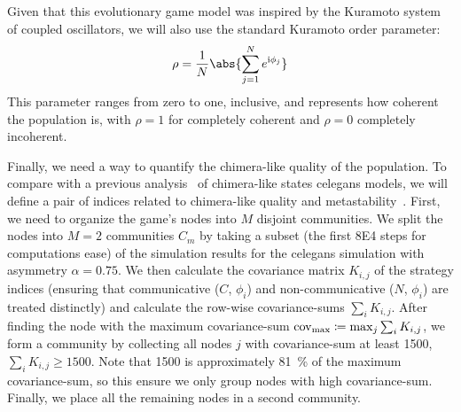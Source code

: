 \documentclass[pdflatex,lineno,referee,sn-nature]{sn-jnl}
\begin{document}
Given that this evolutionary game model was inspired
by the Kuramoto system of coupled oscillators,
we will also use the standard Kuramoto order parameter:
\begin{equation}
  \rho = \frac{1}{N} \abs{\sum_{j=1}^N e^{\im \phi_j}}
  \label{eq:order_parameter}
\end{equation}
This parameter ranges from zero to one, inclusive,
and represents how coherent the population is,
with $\rho = 1$ for completely coherent and $\rho = 0$ completely incoherent.

Finally, we need a way to quantify
the chimera-like quality of the population.
To compare with a previous analysis~\citep{hizanidis2016chimera} of
chimera-like states \gls{celegans} models,
we will define a pair of indices related to
chimera-like quality and metastability~\citep{shanahan2010metastable}.
First, we need to organize the game's nodes
into $M$ disjoint communities.
We split the nodes into $M=2$ communities $C_m$
by taking a subset
(the first \num{8E4} steps for computations ease)
of the simulation results
for the \gls{celegans} simulation with asymmetry $\alpha = \num{0.75}$.
We then calculate the covariance matrix $K_{i,j}$ of the strategy indices
(ensuring that communicative ($C$, $\phi_i$)
and non-communicative ($N$, $\phi_i$) are treated distinctly)
and calculate the row-wise covariance-sums  $\sum_i K_{i,j}$.
After finding the node with the maximum covariance-sum
$\operatorname{cov}_{\text{max}} \coloneqq \max_j{\sum_i K_{i,j}}$,
we form a community by collecting all nodes $j$ with covariance-sum
at least \num{1500}, $\sum_i K_{i,j} \ge 1500$.
Note that \num{1500} is approximately \SI{81}{\percent}
of the maximum covariance-sum,
so this ensure we only group nodes with high covariance-sum.
Finally, we place all the remaining nodes in a second community.
\end{document}
